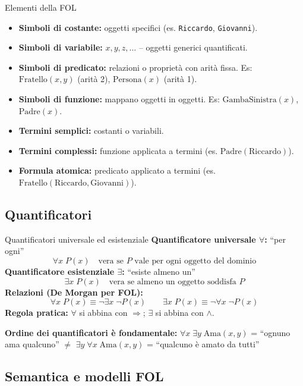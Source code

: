 \documentclass[12pt,a4paper]{article}
\begin{document}
\begin{defbox}{Elementi della FOL}
\begin{itemize}[noitemsep]
  \item \textbf{Simboli di costante:} oggetti specifici (es. \texttt{Riccardo}, \texttt{Giovanni}).
  \item \textbf{Simboli di variabile:} $x, y, z, \ldots$ -- oggetti generici quantificati.
  \item \textbf{Simboli di predicato:} relazioni o proprietà con arità fissa. Es: $\text{Fratello}(x,y)$ (arità 2), $\text{Persona}(x)$ (arità 1).
  \item \textbf{Simboli di funzione:} mappano oggetti in oggetti. Es: $\text{GambaSinistra}(x)$, $\text{Padre}(x)$.
  \item \textbf{Termini semplici:} costanti o variabili.
  \item \textbf{Termini complessi:} funzione applicata a termini (es. $\text{Padre}(\text{Riccardo})$).
  \item \textbf{Formula atomica:} predicato applicato a termini (es. $\text{Fratello}(\text{Riccardo},\text{Giovanni})$).
\end{itemize}
\end{defbox}

\subsection{Quantificatori}

\begin{formulabox}{Quantificatori universale ed esistenziale}
\textbf{Quantificatore universale $\forall$:} ``per ogni''
\[
\forall x\; P(x) \quad \text{vera se } P \text{ vale per ogni oggetto del dominio}
\]
\textbf{Quantificatore esistenziale $\exists$:} ``esiste almeno un''
\[
\exists x\; P(x) \quad \text{vera se almeno un oggetto soddisfa } P
\]
\textbf{Relazioni (De Morgan per FOL):}
\[
\forall x\; P(x) \equiv \neg \exists x\; \neg P(x)
\qquad
\exists x\; P(x) \equiv \neg \forall x\; \neg P(x)
\]
\textbf{Regola pratica:} $\forall$ si abbina con $\Rightarrow$; $\exists$ si abbina con $\land$.

\textbf{Ordine dei quantificatori è fondamentale:}
$\forall x\; \exists y\; \text{Ama}(x,y)$ = ``ognuno ama qualcuno'' $\neq$
$\exists y\; \forall x\; \text{Ama}(x,y)$ = ``qualcuno è amato da tutti''
\end{formulabox}

\subsection{Semantica e modelli FOL}
\end{document}
